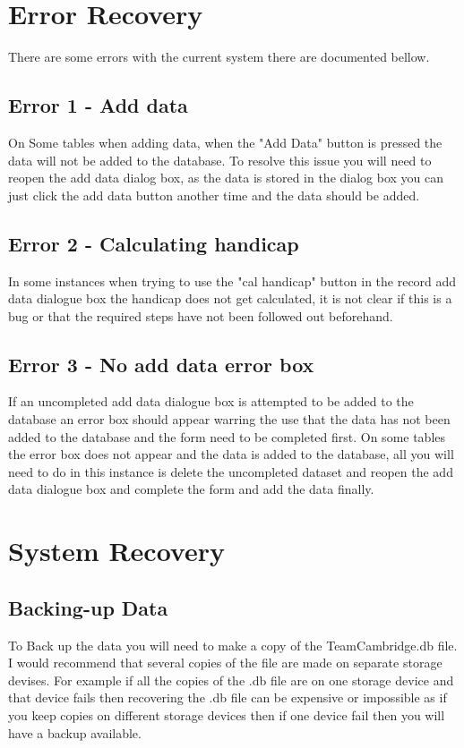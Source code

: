 \section{Error Recovery}
There are some errors with the current system there are documented bellow.

\subsection{Error 1 - Add data}
On Some tables when adding data, when the "Add Data" button is pressed the data will not be added to the database. To resolve this issue you will need to reopen the add data dialog box, as the data is stored in the dialog box you can just click the add data button another time and the data should be added.

\subsection{Error 2 - Calculating handicap}
In some instances when trying to use the "cal handicap" button in the record add data dialogue box the handicap does not get calculated, it is not clear if this is a bug or that the required steps have not been followed out beforehand.

\subsection{Error 3 - No add data error box}
If an uncompleted add data dialogue box is attempted to be added to the database an error box should appear warring the use that the data has not been added to the database and the form need to be completed first. On some tables the error box does not appear and the data is added to the database, all you will need to do in this instance is delete the uncompleted dataset and reopen the add data dialogue box and complete the form and add the data finally.

\section{System Recovery}

\subsection{Backing-up Data}
To Back up the data you will need to make a copy of the TeamCambridge.db file. I would recommend that several copies of the file are made on separate storage devises. For example if all the copies of the .db file are on one storage device and that device fails then recovering the .db file can be expensive or impossible as if you keep copies on different storage devices then if one device fail then you will have a backup available.

